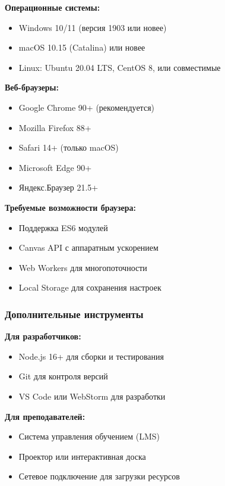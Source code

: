 \documentclass[14pt,russian]{extarticle}
\begin{document}
\textbf{Операционные системы:}
\begin{itemize}
    \item Windows 10/11 (версия 1903 или новее)
    \item macOS 10.15 (Catalina) или новее
    \item Linux: Ubuntu 20.04 LTS, CentOS 8, или совместимые
\end{itemize}

\textbf{Веб-браузеры:}
\begin{itemize}
    \item Google Chrome 90+ (рекомендуется)
    \item Mozilla Firefox 88+
    \item Safari 14+ (только macOS)
    \item Microsoft Edge 90+
    \item Яндекс.Браузер 21.5+
\end{itemize}

\textbf{Требуемые возможности браузера:}
\begin{itemize}
    \item Поддержка ES6 модулей
    \item Canvas API с аппаратным ускорением
    \item Web Workers для многопоточности
    \item Local Storage для сохранения настроек
\end{itemize}

\subsubsection{Дополнительные инструменты}

\textbf{Для разработчиков:}
\begin{itemize}
    \item Node.js 16+ для сборки и тестирования
    \item Git для контроля версий
    \item VS Code или WebStorm для разработки
\end{itemize}

\textbf{Для преподавателей:}
\begin{itemize}
    \item Система управления обучением (LMS)
    \item Проектор или интерактивная доска
    \item Сетевое подключение для загрузки ресурсов
\end{itemize}
\end{document}
